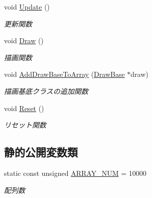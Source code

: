 \begin{DoxyCompactItemize}
void \mbox{\hyperlink{class_render_target_shadow_map_aeba65fc4188bb72dd840f775900d0391}{Update}} ()
\begin{DoxyCompactList}\small\item\em 更新関数 \end{DoxyCompactList}\item 
void \mbox{\hyperlink{class_render_target_shadow_map_afc267e5e736c1bbeb2290663df2a4b01}{Draw}} ()
\begin{DoxyCompactList}\small\item\em 描画関数 \end{DoxyCompactList}\item 
void \mbox{\hyperlink{class_render_target_shadow_map_ad48ed36a4d46cdc06c1f4a0d95ee6e99}{Add\+Draw\+Base\+To\+Array}} (\mbox{\hyperlink{class_draw_base}{Draw\+Base}} $\ast$draw)
\begin{DoxyCompactList}\small\item\em 描画基底クラスの追加関数 \end{DoxyCompactList}\item 
void \mbox{\hyperlink{class_render_target_shadow_map_a6bc527acde727f9005f056fc36f941be}{Reset}} ()
\begin{DoxyCompactList}\small\item\em リセット関数 \end{DoxyCompactList}\end{DoxyCompactItemize}
\subsection*{静的公開変数類}
\begin{DoxyCompactItemize}
\item 
static const unsigned \mbox{\hyperlink{class_render_target_shadow_map_a25b5fd61eef50d76b69314102ccc51fe}{A\+R\+R\+A\+Y\+\_\+\+N\+UM}} = 10000
\begin{DoxyCompactList}\small\item\em 配列数 \end{DoxyCompactList}\end{DoxyCompactItemize}

